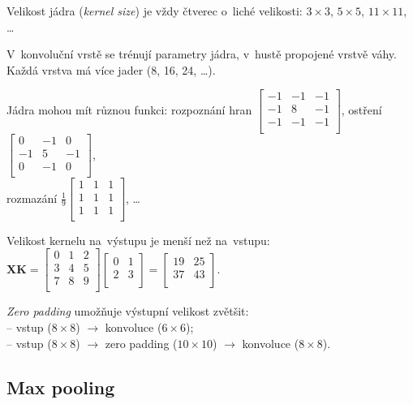 Velikost jádra (\emph{kernel size}) je vždy čtverec o~liché velikosti: $3\times3$, $5 \times 5$, $11 \times 11$, \dots

V~konvoluční vrstě se trénují parametry jádra, v~hustě propojené vrstvě váhy.
Každá vrstva má více jader (8, 16, 24, \dots).

Jádra mohou mít různou funkci:
rozpoznání hran $\left[ \begin{matrix}
-1 & -1 & -1 \\
-1 &  8 & -1 \\
-1 & -1 & -1 \\
\end{matrix} \right]$,
ostření $\left[ \begin{matrix}
 0 & -1 &  0 \\
-1 &  5 & -1 \\
 0 & -1 &  0 \\
\end{matrix} \right]$,
\\
rozmazání $\frac{1}{9} \left[ \begin{matrix}
1 & 1 & 1 \\
1 & 1 & 1 \\
1 & 1 & 1 \\
\end{matrix} \right]$,
\dots

Velikost kernelu na~výstupu je menší než na~vstupu:
$\mathbf{X} \mathbf{K} = \left[ \begin{matrix}
0 & 1 & 2 \\
3 & 4 & 5 \\
7 & 8 & 9 \\
\end{matrix} \right] \left[ \begin{matrix}
0 & 1 \\
2 & 3 \\
\end{matrix} \right] = \left[ \begin{matrix}
19 & 25 \\
37 & 43 \\
\end{matrix} \right]$.

\emph{Zero padding} umožňuje výstupní velikost zvětšit:
\\-- vstup ($8 \times 8$) $\rightarrow$ konvoluce ($6 \times 6$);
\\-- vstup ($8 \times 8$) $\rightarrow$ zero padding ($10 \times 10$) $\rightarrow$ konvoluce ($8 \times 8$).

\subsection{Max pooling}

